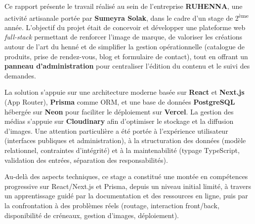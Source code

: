 Ce rapport présente le travail réalisé au sein de l’entreprise \textbf{RUHENNA}, une activité artisanale portée par \textbf{Sumeyra Solak}, dans le cadre d’un stage de 2\textsuperscript{ème} année. L’objectif du projet était de concevoir et développer une plateforme web \textit{full-stack} permettant de renforcer l’image de marque, de valoriser les créations autour de l’art du henné et de simplifier la gestion opérationnelle (catalogue de produits, prise de rendez-vous, blog et formulaire de contact), tout en offrant un \textbf{panneau d’administration} pour centraliser l’édition du contenu et le suivi des demandes.

La solution s’appuie sur une architecture moderne basée sur \textbf{React} et \textbf{Next.js} (App Router), \textbf{Prisma} comme ORM, et une base de données \textbf{PostgreSQL} hébergée sur \textbf{Neon} pour faciliter le déploiement sur \textbf{Vercel}. La gestion des médias s’appuie sur \textbf{Cloudinary} afin d’optimiser le stockage et la diffusion d’images. Une attention particulière a été portée à l’expérience utilisateur (interfaces publiques et administration), à la structuration des données (modèle relationnel, contraintes d’intégrité) et à la maintenabilité (typage TypeScript, validation des entrées, séparation des responsabilités).

Au-delà des aspects techniques, ce stage a constitué une montée en compétences progressive sur React/Next.js et Prisma, depuis un niveau initial limité, à travers un apprentissage guidé par la documentation et des ressources en ligne, puis par la confrontation à des problèmes réels (routage, interaction front/back, disponibilité de créneaux, gestion d’images, déploiement).
